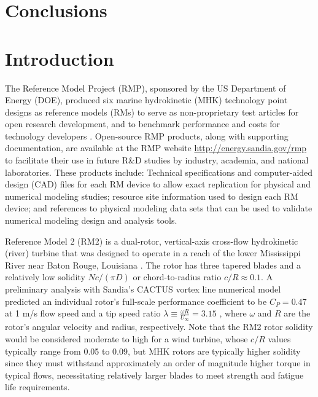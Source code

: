 \section{Conclusions}




\section{Introduction}

The Reference Model Project (RMP), sponsored by the US Department of Energy
(DOE), produced six marine hydrokinetic (MHK) technology point designs as
reference models (RMs) to serve as non-proprietary test articles for open
research development, and to benchmark performance and costs for technology
developers \cite{Neary2014, Neary2014a}. Open-source RMP products, along with
supporting documentation, are available at the RMP website
\url{http://energy.sandia.gov/rmp} to facilitate their use in future R\&D
studies by industry, academia, and national laboratories. These products
include: Technical specifications and computer-aided design (CAD) files for each
RM device to allow exact replication for physical and numerical modeling
studies; resource site information used to design each RM device; and references
to physical modeling data sets that can be used to validate numerical modeling
design and analysis tools.

Reference Model 2 (RM2) is a dual-rotor, vertical-axis cross-flow hydrokinetic
(river) turbine that was designed to operate in a reach of the lower Mississippi
River near Baton Rouge, Louisiana \cite{Barone2011, Neary2011}. The rotor has
three tapered blades and a relatively low solidity $Nc/(\pi D)$ or
chord-to-radius ratio $c/R \approx 0.1$. A preliminary analysis with Sandia's
CACTUS vortex line numerical model \cite{Murray2011} predicted an individual
rotor's full-scale performance coefficient to be $C_P=0.47$ at 1 m/s flow speed
and a tip speed ratio $\lambda \equiv \frac{\omega R}{U_\infty} = 3.15$
\cite{Barone2011}, where $\omega$ and $R$ are the rotor's angular velocity and
radius, respectively. Note that the RM2 rotor solidity would be considered
moderate to high for a wind turbine, whose $c/R$ values typically range from
0.05 to 0.09, but MHK rotors are typically higher solidity since they must
withstand approximately an order of magnitude higher torque in typical flows,
necessitating relatively larger blades to meet strength and fatigue life
requirements.

